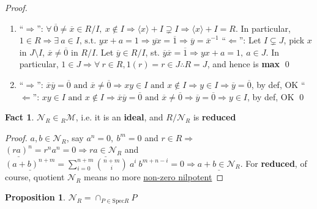 \documentclass[12pt,a4paper]{article}
\theoremstyle{definition}
\newtheorem{proposition}{Proposition}
\newtheorem{fact}{Fact}
\begin{document}
\noindent\textit{Proof.}
  \begin{enumerate} [(1)]
    \item ``$\Rightarrow$'': $\forall\ \overline{0} \neq \overline{x} \in R/I,\ x \notin I \Rightarrow \langle x \rangle + I \supsetneq I \Rightarrow \langle x \rangle + I = R$. In particular, $1 \in R \Rightarrow \exists\ a \in I \text{, s.t. } yx + a = 1 \Rightarrow \overline{yx} = \overline{1} \Rightarrow \overline{y} = \overline{x}^{-1}$ \newline
    ``$\Leftarrow$'': Let $I \subsetneq J$, pick $x$ in $J \setminus I$, $\overline{x} \neq \overline{0}$ in $R/I$. Let $\overline{y} \in R/I$, st. $\overline{y}\overline{x} = \overline{1} \Rightarrow yx + a = 1,\ a \in J$. In particular, $1 \in J \Rightarrow \forall\ r \in R, 1(r) = r \in J \therefore R = J$, and hence is \textbf{max} \qed
    \item ``$\Rightarrow$'': $\overline{x}\overline{y} = \overline{0} \text{ and } \overline{x} \neq \overline{0} \Rightarrow xy \in I \text{ and } x \notin I \Rightarrow y \in I \Rightarrow \overline{y} = \overline{0}$, by def, OK \newline
    ``$\Leftarrow$'': $xy \in I \text{ and } x \notin I \Rightarrow \overline{x}\overline{y} = \overline{0} \text{ and } \overline{x} \neq \overline{0} \Rightarrow \overline{y} = \overline{0} \Rightarrow y \in I$, by def, OK \qed
  \end{enumerate}
\vspace{0.125em}

\begin{fact}
  $\mathcal{N}_R \in \text{}_R \mathcal{M}$, i.e. it is an \textbf{ideal}, and \underline{$R/\mathcal{N}_R$} is \textbf{reduced}
\end{fact}

\begin{proof}
  $a, b \in \mathcal{N}_R$, say $a^n = 0,\ b^m = 0$ and $r \in R \Rightarrow$ $\underline{(ra)^n} = r^n a^n = 0 \Rightarrow \underline{ra \in \mathcal{N}_R}$ and $\underline{(a + b)^{n + m}} = \sum_{i = 0}^{n + m} {{n + m}\choose{i}}\ a^i\ b^{m + n - i} = 0 \Rightarrow \underline{a + b \in \mathcal{N}_R}$. For \textbf{reduced}, of course, quotient $\mathcal{N}_R$ means no more \underline{non-zero nilpotent}
\end{proof}
\vspace{0.125em}

\begin{proposition}
  $\boxed{\mathcal{N}_R = \cap_{P \in \text{Spec}R} P}$
\end{proposition}
\end{document}

